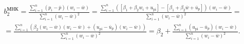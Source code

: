 \documentclass[a4paper,12pt]{article}
\begin{document}
\begin{multline}\tag{\Upsilon}
  b_2^\text{МНК} =
  \frac{\sum\limits_{i=1}^{n}(p_i-\overline{p})(w_i-\overline{w})}{\sum\limits_{i=1}^{n}(w_i-\overline{w})^2} =
  \frac{\sum\limits_{i=1}^{n}([\beta_1+\beta_2w_i+u_\mathrm{pi}]-[\beta_1+\beta_2\overline{w}+\overline{u}_p])(w_i-\overline{w})}{\sum\limits_{i=1}^{n}(w_i-\overline{w})^2} = \\
  =\frac{\sum\limits_{i=1}^{n}(\beta_2(w_i-\overline{w})(w_i-\overline{w})+(u_\mathrm{pi}-\overline{u}_p)(w_i - \overline{w}))}{\sum\limits_{i=1}^{n}(w_i-\overline{w})^2} =
  \beta_2 + \frac{\sum\limits_{i=1}^{n}(u_\mathrm{pi}-\overline{u}_p)(w_i-\overline{w})}{\sum\limits_{i=1}^{n}(w_i-\overline{w})^2}.
\end{multline}
\end{document}
